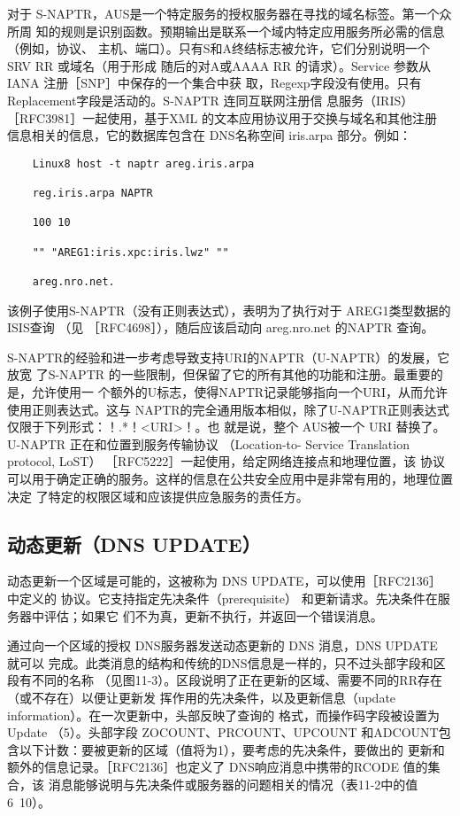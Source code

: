 对于 S-NAPTR，AUS是一个特定服务的授权服务器在寻找的域名标签。第一个众所周
知的规则是识别函数。预期输出是联系一个域内特定应用服务所必需的信息（例如，协议、
主机、端口）。只有S和A终结标志被允许，它们分别说明一个 SRV RR 或域名（用于形成
随后的对A或AAAA RR 的请求）。Service 参数从IANA 注册［SNP］中保存的一个集合中获
取，Regexp字段没有使用。只有 Replacement字段是活动的。S-NAPTR 连同互联网注册信
息服务（IRIS）［RFC3981］一起使用，基于XML 的文本应用协议用于交换与域名和其他注册
信息相关的信息，它的数据库包含在 DNS名称空间 iris.arpa 部分。例如：
\begin{verbatim}
    Linux8 host -t naptr areg.iris.arpa
    
    reg.iris.arpa NAPTR
    
    100 10
    
    "" "AREG1:iris.xpc:iris.lwz" ""
    
    areg.nro.net.
\end{verbatim}

该例子使用S-NAPTR（没有正则表达式），表明为了执行对于 AREG1类型数据的ISIS查询
（见 ［RFC4698］），随后应该启动向 areg.nro.net 的NAPTR 查询。

S-NAPTR的经验和进一步考虑导致支持URI的NAPTR（U-NAPTR）的发展，它放宽
了S-NAPTR 的一些限制，但保留了它的所有其他的功能和注册。最重要的是，允许使用一
个额外的U标志，使得NAPTR记录能够指向一个URI，从而允许使用正则表达式。这与
NAPTR的完全通用版本相似，除了U-NAPTR正则表达式仅限于下列形式：！.*！<URI>！。也
就是说，整个 AUS被一个 URI 替换了。U-NAPTR 正在和位置到服务传输协议 （Location-to-
Service Translation protocol, LoST） ［RFC5222］一起使用，给定网络连接点和地理位置，该
协议可以用于确定正确的服务。这样的信息在公共安全应用中是非常有用的，地理位置决定
了特定的权限区域和应该提供应急服务的责任方。

\subsection{动态更新（DNS UPDATE）}

动态更新一个区域是可能的，这被称为 DNS UPDATE，可以使用［RFC2136］中定义的
协议。它支持指定先决条件（prerequisite） 和更新请求。先决条件在服务器中评估；如果它
们不为真，更新不执行，并返回一个错误消息。

通过向一个区域的授权 DNS服务器发送动态更新的 DNS 消息，DNS UPDATE 就可以
完成。此类消息的结构和传统的DNS信息是一样的，只不过头部字段和区段有不同的名称
（见图11-3）。区段说明了正在更新的区域、需要不同的RR存在（或不存在）以便让更新发
挥作用的先决条件，以及更新信息（update information）。在一次更新中，头部反映了查询的
格式，而操作码字段被设置为Update （5）。头部字段 ZOCOUNT、PRCOUNT、UPCOUNT
和ADCOUNT包含以下计数：要被更新的区域（值将为1），要考虑的先决条件，要做出的
更新和额外的信息记录。［RFC2136］也定义了 DNS响应消息中携带的RCODE 值的集合，该
消息能够说明与先决条件或服务器的问题相关的情况（表11-2中的值6~10）。

